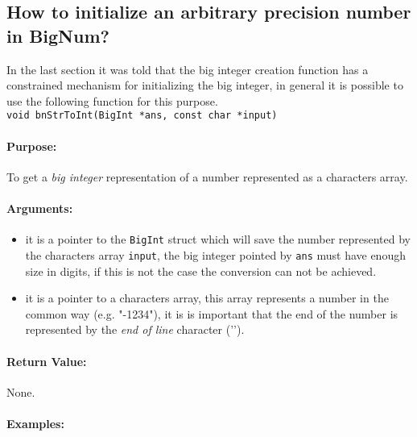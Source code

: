 \documentclass{book}
\begin{document}
\subsection{How to initialize an arbitrary precision number in BigNum?}

In the last section it was told that the big integer creation function has a constrained mechanism for initializing the big integer, in general it is possible to use the following function for this purpose.\\

\verb+void bnStrToInt(BigInt *ans, const char *input)+\\

\paragraph{Purpose:} 

To get a \emph{big integer} representation of a number represented as a characters array.

\paragraph{Arguments:}

\begin{itemize}
\item

 it is a pointer to the \verb+BigInt+ struct which will save the number represented by the characters array \verb+input+, the big integer pointed by \verb+ans+ must have enough size in digits, if this is not the case the conversion can not be achieved.

\item 

 it is a pointer to a characters array, this array represents a number in the common way (e.g. "-1234"), it is is important that the end of the number is represented by the \emph{end of line} character ('\0').  

\end{itemize}

\paragraph{Return Value:}

None.

\paragraph{Examples:}
\end{document}
